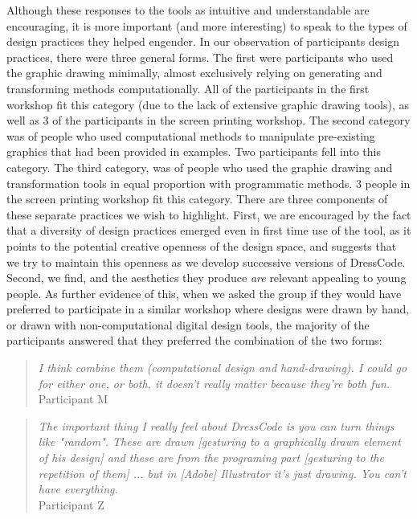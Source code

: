 \documentclass{sigchi}
\begin{document}
Although these responses to the tools as intuitive and understandable are encouraging, it is more important (and more interesting) to speak to the types of design practices they helped engender. In our observation of participants design practices, there were three general forms. The first were participants who used the graphic drawing minimally, almost exclusively relying on generating and transforming methods computationally. All of the participants in the first workshop fit this category (due to the lack of extensive graphic drawing tools), as well as 3 of the participants in the screen printing workshop. The second category was of people who used computational methods to manipulate pre-existing graphics that had been provided in examples. Two participants fell into this category. The third category, was of people who used the graphic drawing and transformation tools in equal proportion with programmatic methods. 3 people in the screen printing workshop fit this category. There are three components of these separate practices we wish to highlight. First, we are encouraged by the fact that a diversity of design practices emerged even in first time use of the tool, as it points to the potential creative openness of the design space, and suggests that we try to maintain this openness as we develop successive versions of DressCode. Second, we find, and the aesthetics they produce \textit{are} relevant appealing to young people. As further evidence of this, when we asked the group if they would have preferred to participate in a similar workshop where designs were drawn by hand, or drawn with non-computational digital design tools, the majority of the participants answered that they preferred the combination of the two forms:
\begin{quotation}
\textit{I think combine them (computational design and hand-drawing). I could go for either one, or both, it doesn't really matter because they're both fun.}
\\Participant M
\end{quotation}
\begin{quotation}
\textit{The important thing I really feel about DressCode is you can turn things like "random". These are drawn [gesturing to a graphically drawn element of his design] and these are from the programing part [gesturing to the repetition of them] ... but in [Adobe] Illustrator it's just drawing. You can't have everything.}
\\Participant Z
\end{quotation}
\end{document}
